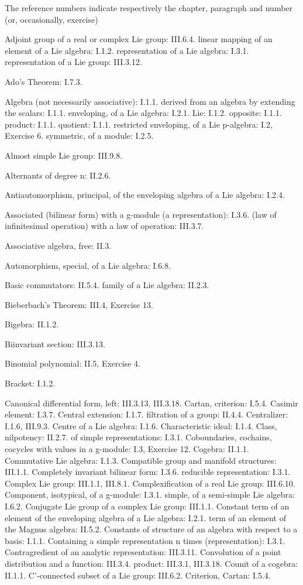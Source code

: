 
The reference numbers indicate respectively the chapter, paragraph and number (or, occasionally, exercise)

Adjoint group of a real or complex Lie group: III.6.4. linear mapping of an element of a Lie algebra: I.1.2. representation of a Lie algebra: I.3.1. representation of a Lie group: III.3.12.

Ado's Theorem: I.7.3.

Algebra (not necessarily associative): I.1.1. derived from an algebra by extending the scalars: I.1.1. enveloping, of a Lie algebra: I.2.1. Lie: I.1.2. opposite: I.1.1. product: I.1.1. quotient: I.1.1. restricted enveloping, of a Lie p-algebra: I.2, Exercise 6. symmetric, of a module: I.2.5.

Almost simple Lie group: III.9.8.

Alternants of degree n: II.2.6.

Antiautomorphism, principal, of the enveloping algebra of a Lie algebra: I.2.4.

Associated (bilinear form) with a g-module (a representation): I.3.6. (law of infinitesimal operation) with a law of operation: III.3.7.

Associative algebra, free: II.3.

Automorphism, special, of a Lie algebra: I.6.8.

Basic commutators: II.5.4. family of a Lie algebra: II.2.3.

Bieberbach's Theorem: III.4, Exercise 13.

Bigebra: II.1.2.

Biinvariant section: III.3.13.

Binomial polynomial: II.5, Exercise 4.

Bracket: I.1.2.

Canonical differential form, left: III.3.13, III.3.18. Cartan, criterion: I.5.4. Casimir element: I.3.7. Central extension: I.1.7. filtration of a group: II.4.4. Centralizer: I.1.6, III.9.3. Centre of a Lie algebra: I.1.6. Characteristic ideal: I.1.4. Class, nilpotency: II.2.7. of simple representations: I.3.1. Coboundaries, cochains, cocycles with values in a g-module: I.3, Exercise 12. Cogebra: II.1.1. Commutative Lie algebra: I.1.3. Compatible group and manifold structures: III.1.1. Completely invariant bilinear form: I.3.6. reducible representation: I.3.1. Complex Lie group: III.1.1, III.8.1. Complexification of a real Lie group: III.6.10. Component, isotypical, of a g-module: I.3.1. simple, of a semi-simple Lie algebra: I.6.2. Conjugate Lie group of a complex Lie group: III.1.1. Constant term of an element of the enveloping algebra of a Lie algebra: I.2.1. term of an element of the Magnus algebra: II.5.2. Constants of structure of an algebra with respect to a basis: I.1.1. Containing a simple representation n times (representation): I.3.1. Contragredient of an analytic representation: III.3.11. Convolution of a point distribution and a function: III.3.4. product: III.3.1, III.3.18. Counit of a cogebra: II.1.1. C'-connected subset of a Lie group: III.6.2. Criterion, Cartan: I.5.4.

